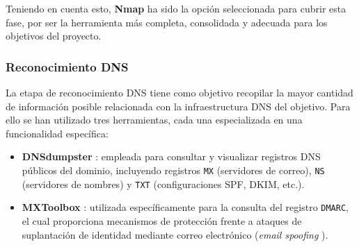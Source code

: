 \begin{parskipenv}
\begin{table}[H]
\centering
\renewcommand{\arraystretch}{1.4}
\caption{Comparativa de herramientas para escaneo de puertos y servicios.}
\label{tabla:comparativa_escaneo_puertos}
\end{table}

Teniendo en cuenta esto, \textbf{Nmap} ha sido la opción seleccionada para cubrir esta fase, por ser la herramienta más completa, consolidada y adecuada para los objetivos del proyecto.

\subsubsection*{Reconocimiento DNS}
La etapa de reconocimiento DNS tiene como objetivo recopilar la mayor cantidad de información posible relacionada con la infraestructura DNS del objetivo. Para ello se han utilizado tres herramientas, cada una especializada en una funcionalidad específica:

\begin{itemize}
    \item \textbf{DNSdumpster} \cite{dnsdumpster}: empleada para consultar y visualizar registros DNS públicos del dominio, incluyendo registros \texttt{MX} (servidores de correo), \texttt{NS} (servidores de nombres) y \texttt{TXT} (configuraciones SPF, DKIM, etc.).
    
    \item \textbf{MXToolbox} \cite{mxtoolbox}: utilizada específicamente para la consulta del registro \texttt{DMARC}, el cual proporciona mecanismos de protección frente a ataques de suplantación de identidad mediante correo electrónico (\textit{email spoofing} \cite{emailspoofing}).
    

\end{itemize}
\end{parskipenv}
